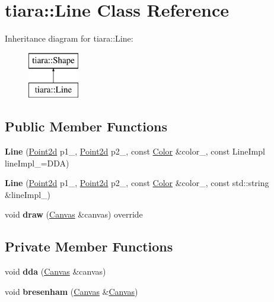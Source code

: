 \hypertarget{classtiara_1_1Line}{}\section{tiara\+::Line Class Reference}
\label{classtiara_1_1Line}
Inheritance diagram for tiara\+::Line\+:\begin{figure}[H]
\begin{center}
\leavevmode
\includegraphics[height=2.000000cm]{classtiara_1_1Line}
\end{center}
\end{figure}
\subsection*{Public Member Functions}
\begin{DoxyCompactItemize}
\item 
\mbox{\label{classtiara_1_1Line_a6f7bd7b666635c7571f156f98692faf4}} 
{\bfseries Line} (\mbox{\hyperlink{classtiara_1_1Point2d}{Point2d}} p1\+\_\+, \mbox{\hyperlink{classtiara_1_1Point2d}{Point2d}} p2\+\_\+, const \mbox{\hyperlink{classtiara_1_1Color}{Color}} \&color\+\_\+, const Line\+Impl line\+Impl\+\_\+=D\+DA)
\item 
\mbox{\label{classtiara_1_1Line_a6a1495fbc86565789d3a1d597e8037b2}} 
{\bfseries Line} (\mbox{\hyperlink{classtiara_1_1Point2d}{Point2d}} p1\+\_\+, \mbox{\hyperlink{classtiara_1_1Point2d}{Point2d}} p2\+\_\+, const \mbox{\hyperlink{classtiara_1_1Color}{Color}} \&color\+\_\+, const std\+::string \&line\+Impl\+\_\+)
\item 
\mbox{\label{classtiara_1_1Line_a9c5d98aaec61d5215129070145ac1f9a}} 
void {\bfseries draw} (\mbox{\hyperlink{classtiara_1_1Canvas}{Canvas}} \&canvas) override
\end{DoxyCompactItemize}
\subsection*{Private Member Functions}
\begin{DoxyCompactItemize}
\item 
\mbox{\label{classtiara_1_1Line_a7f1038c97348ae4d936f1b6b59fd633b}} 
void {\bfseries dda} (\mbox{\hyperlink{classtiara_1_1Canvas}{Canvas}} \&canvas)
\item 
\mbox{\label{classtiara_1_1Line_aa66e628cf9d1c54393e1b3fe0d40e27d}} 
void {\bfseries bresenham} (\mbox{\hyperlink{classtiara_1_1Canvas}{Canvas}} \&\mbox{\hyperlink{classtiara_1_1Canvas}{Canvas}})
\end{DoxyCompactItemize}
